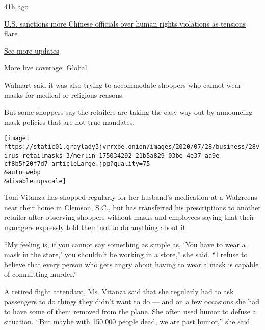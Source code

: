 \href{https://www.nytimes3xbfgragh.onion/live/2020/07/31/business/stock-market-today-coronavirus?action=click\&pgtype=Article\&state=default\&region=MAIN_CONTENT_1\&context=storylines_live_updates\#us-sanctions-more-chinese-officials-over-human-rights-violations-as-tensions-flare}{41h
ago}

\href{https://www.nytimes3xbfgragh.onion/live/2020/07/31/business/stock-market-today-coronavirus?action=click\&pgtype=Article\&state=default\&region=MAIN_CONTENT_1\&context=storylines_live_updates\#us-sanctions-more-chinese-officials-over-human-rights-violations-as-tensions-flare}{U.S.
sanctions more Chinese officials over human rights violations as
tensions flare}

\href{https://www.nytimes3xbfgragh.onion/live/2020/07/31/business/stock-market-today-coronavirus?action=click\&pgtype=Article\&state=default\&region=MAIN_CONTENT_1\&context=storylines_live_updates}{See
more updates}

More live coverage:
\href{https://www.nytimes3xbfgragh.onion/2020/08/01/world/coronavirus-covid-19.html?action=click\&pgtype=Article\&state=default\&region=MAIN_CONTENT_1\&context=storylines_live_updates}{Global}

Walmart said it was also trying to accommodate shoppers who cannot wear
masks for medical or religious reasons.

But some shoppers say the retailers are taking the easy way out by
announcing mask policies that are not true mandates.

\texttt{[image: https://static01.graylady3jvrrxbe.onion/images/2020/07/28/business/28virus-retailmasks-3/merlin\_175034292\_21b5a829-03be-4e37-aa9e-cf8b5f20f7d7-articleLarge.jpg?quality=75\\\&auto=webp\\\&disable=upscale]}

Toni Vitanza has shopped regularly for her husband's medication at a
Walgreens near their home in Clemson, S.C., but has transferred his
prescriptions to another retailer after observing shoppers without masks
and employees saying that their managers expressly told them not to do
anything about it.

``My feeling is, if you cannot say something as simple as, `You have to
wear a mask in the store,' you shouldn't be working in a store,'' she
said. ``I refuse to believe that every person who gets angry about
having to wear a mask is capable of committing murder.''

A retired flight attendant, Ms. Vitanza said that she regularly had to
ask passengers to do things they didn't want to do --- and on a few
occasions she had to have some of them removed from the plane. She often
used humor to defuse a situation. ``But maybe with 150,000 people dead,
we are past humor,'' she said.

